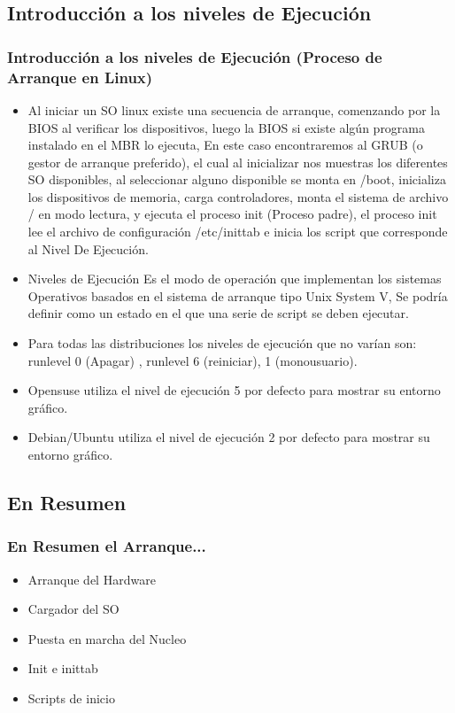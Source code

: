 \documentclass{beamer}
\begin{document}
\subsection{Introducci\'on a los niveles de Ejecuci\'on}
\begin{frame}
\frametitle{Introducci\'on a los niveles de Ejecuci\'on (Proceso de Arranque en Linux)}
\begin{itemize}
\item Al iniciar un SO linux existe una secuencia de arranque, comenzando por la BIOS al verificar los dispositivos, luego la BIOS si existe alg\'un programa instalado en el MBR lo ejecuta, En este caso encontraremos al GRUB (o gestor de arranque preferido), el cual al inicializar nos muestras los diferentes SO disponibles, al seleccionar alguno disponible se monta en /boot, inicializa los dispositivos de memoria, carga controladores, monta el sistema de archivo / en modo lectura, y ejecuta el proceso init (Proceso padre), el proceso init lee el archivo de configuraci\'on /etc/inittab e inicia los script que corresponde al Nivel De Ejecuci\'on.
\end{itemize}
\end{frame}

\begin{frame}
\begin{itemize}
\frametitle{Introducci\'on a los niveles de Ejecuci\'on (Proceso de Arranque en Linux)}
\item \alert{Niveles de Ejecuci\'on} Es el modo de operaci\'on que implementan los sistemas Operativos basados en el sistema de arranque tipo Unix System V, Se podr\'ia definir como un estado en el que una serie de script se deben ejecutar.
\item Para todas las distribuciones los niveles de ejecuci\'on que no var\'ian son: runlevel 0 (Apagar) , runlevel 6 (reiniciar), 1 (monousuario).
\item Opensuse utiliza el nivel de ejecuci\'on 5 por defecto para mostrar su entorno gráfico.
\item Debian/Ubuntu utiliza el nivel de ejecuci\'on 2 por defecto para mostrar su entorno gráfico.
\end{itemize}
\end{frame}

\subsection{En Resumen}
\begin{frame}
\frametitle{En Resumen el Arranque...}
\begin{itemize}
	\item Arranque del Hardware
	\item Cargador del SO
	\item Puesta en marcha del Nucleo
	\item Init e inittab
	\item Scripts de inicio
\end{itemize}
\end{frame}
\end{document}
